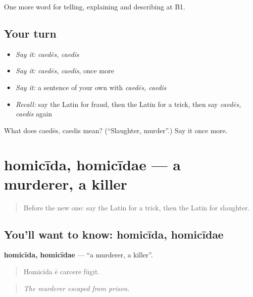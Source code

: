 \begin{grammarlens}[title={What you've built}]
One more word for telling, explaining and describing at B1.
\end{grammarlens}

\subsection*{Your turn}
\begin{itemize}
\raggedright
  \item \emph{Say it:} \emph{caedēs, caedis}
  \item \emph{Say it:} \emph{caedēs, caedis}, once more
  \item \emph{Say it:} a sentence of your own with \emph{caedēs, caedis}
  \item \emph{Recall:} say the Latin for fraud, then the Latin for a trick, then say \emph{caedēs, caedis} again
\end{itemize}

\begin{tcolorbox}[breakable,colback=teal!4,colframe=teal!35!black,title={Before you move on}]
What does caedēs, caedis mean? (\textquotedblleft{}Slaughter, murder\textquotedblright{}.) Say it once more.
\end{tcolorbox}
\section[homicīda, homicīdae]{homicīda, homicīdae — a murderer, a killer}

\label{lesson:LA-C306-homicida}



\begin{quote}
Before the new one: say the Latin for a trick, then the Latin for slaughter.
\end{quote}

\subsection*{You'll want to know: homicīda, homicīdae}
\textbf{homicīda, homicīdae} — \textquotedblleft{}a murderer, a killer\textquotedblright{}.

\begin{quote}
Homicīda ē carcere fūgit.
\end{quote}

\begin{quote}
\emph{The murderer escaped from prison.}
\end{quote}

